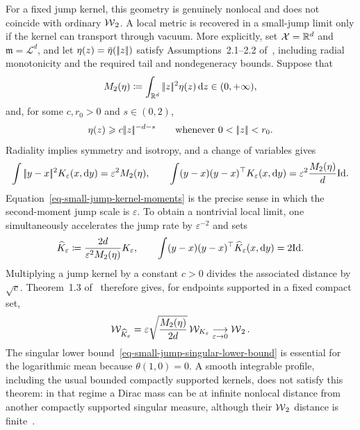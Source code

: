 For a fixed jump kernel, this geometry is genuinely nonlocal and does not coincide with ordinary $\operatorname{\mathcal{W}}_2$. A local metric is recovered in a small-jump limit only if the kernel can transport through vacuum. More explicitly, set $\mathcal X=\mathbb{R}^d$ and $\mathfrak m=\mathcal L^d$, and let $\eta(z)=\bar\eta(|\!| z |\!|)$ satisfy Assumptions~2.1--2.2 of~\cite{SlepcevWarren2022NonlocalWasserstein}, including radial monotonicity and the required tail and nondegeneracy bounds. Suppose that
\[
	M_2(\eta)\coloneqq\int_{\mathbb{R}^d}|\!| z |\!|^2\eta(z)\,\mathrm{d} z\in(0,+\infty),
\]
and, for some $c,r_0>0$ and $s\in(0,2)$,
\begin{equation}\label{eq-small-jump-singular-lower-bound}
	\eta(z)\geq c\norm{z}^{-d-s}
		\qquad\text{whenever }0<\norm{z}<r_0.
\end{equation}
Radiality implies symmetry and isotropy, and a change of variables gives
\begin{equation}\label{eq-small-jump-kernel-moments}
	\int|\!| y-x |\!|^2K_\varepsilon(x,\mathrm{d} y)
	=
	\varepsilon^2M_2(\eta),
	\qquad
	\int (y-x)(y-x)^\top K_\varepsilon(x,\mathrm{d} y)
	=
	\varepsilon^2\frac{M_2(\eta)}{d}\mathrm{Id}.
\end{equation}
Equation~\eqref{eq-small-jump-kernel-moments} is the precise sense in which the second-moment jump scale is $\varepsilon$. To obtain a nontrivial local limit, one simultaneously accelerates the jump rate by $\varepsilon^{-2}$ and sets
\[
	\widehat K_\varepsilon
	\coloneqq
	\frac{2d}{\varepsilon^2M_2(\eta)}K_\varepsilon,
	\qquad
	\int (y-x)(y-x)^\top\widehat K_\varepsilon(x,\mathrm{d} y)=2\mathrm{Id}.
\]
Multiplying a jump kernel by a constant $c>0$ divides the associated distance by $\sqrt c$. Theorem~1.3 of~\cite{SlepcevWarren2022NonlocalWasserstein} therefore gives, for endpoints supported in a fixed compact set,
\[
	\mathcal W_{\widehat K_\varepsilon}
	=
	\varepsilon\sqrt{\frac{M_2(\eta)}{2d}}\,
	\mathcal W_{K_\varepsilon}
	\underset{\varepsilon\to0}{\longrightarrow}
	\operatorname{\mathcal{W}}_2.
\]
The singular lower bound~\eqref{eq-small-jump-singular-lower-bound} is essential for the logarithmic mean because $\theta(1,0)=0$. A smooth integrable profile, including the usual bounded compactly supported kernels, does not satisfy this theorem: in that regime a Dirac mass can be at infinite nonlocal distance from another compactly supported singular measure, although their $\operatorname{\mathcal{W}}_2$ distance is finite~\cite[Proposition~1.1]{SlepcevWarren2022NonlocalWasserstein}.

